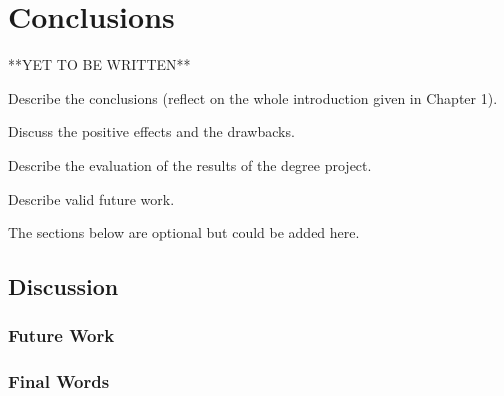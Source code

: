 \chapter{Conclusions}
\label{chap:conclusions}

**YET TO BE WRITTEN**

Describe the conclusions (reflect on the whole introduction given in Chapter 1). 

Discuss the positive effects and the drawbacks. 

Describe the evaluation of the results of the degree project.

Describe valid future work.  

The sections below are optional but could be added here.

\section{Discussion}

\subsection{Future Work}

\subsection{Final Words}







